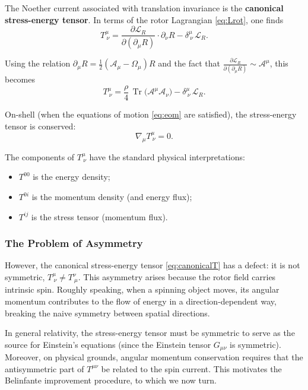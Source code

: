 \documentclass[11pt,a4paper]{article}
\numberwithin{equation}{section}
\theoremstyle{plain}
\theoremstyle{definition}
\theoremstyle{remark}
\DeclareMathOperator{\Tr}{Tr}
\begin{document}
The Noether current associated with translation invariance is the \textbf{canonical stress-energy tensor}. In terms of the rotor Lagrangian \eqref{eq:Lrot}, one finds
\begin{equation}
T^\mu_{\ \nu} = \frac{\partial \mathcal{L}_R}{\partial(\partial_\mu R)} \cdot \partial_\nu R - \delta^\mu_{\ \nu}\,\mathcal{L}_R.
\end{equation}

Using the relation $\partial_\mu R = \frac{1}{2}(\mathcal{A}_\mu - \Omega_\mu)R$ and the fact that $\frac{\partial \mathcal{L}_R}{\partial(\partial_\mu R)} \sim \mathcal{A}^\mu$, this becomes
\begin{equation}
T^\mu_{\ \nu} = \frac{\rho}{4}\,\Tr\!\big(\mathcal{A}^\mu\mathcal{A}_\nu\big) - \delta^\mu_{\ \nu}\,\mathcal{L}_R.
\label{eq:canonicalT}
\end{equation}

On-shell (when the equations of motion \eqref{eq:eom} are satisfied), the stress-energy tensor is conserved:
\begin{equation}
\nabla_\mu T^\mu_{\ \nu} = 0.
\label{eq:T-conserved}
\end{equation}

The components of $T^\mu_{\ \nu}$ have the standard physical interpretations:

\begin{itemize}
  \item $T^{00}$ is the energy density;
  \item $T^{0i}$ is the momentum density (and energy flux);
  \item $T^{ij}$ is the stress tensor (momentum flux).
\end{itemize}

\subsubsection{The Problem of Asymmetry}

However, the canonical stress-energy tensor \eqref{eq:canonicalT} has a defect: it is not symmetric, $T^\mu_{\ \nu} \neq T^\nu_{\ \mu}$. This asymmetry arises because the rotor field carries intrinsic spin. Roughly speaking, when a spinning object moves, its angular momentum contributes to the flow of energy in a direction-dependent way, breaking the naive symmetry between spatial directions.

In general relativity, the stress-energy tensor must be symmetric to serve as the source for Einstein's equations (since the Einstein tensor $G_{\mu\nu}$ is symmetric). Moreover, on physical grounds, angular momentum conservation requires that the antisymmetric part of $T^{\mu\nu}$ be related to the spin current. This motivates the Belinfante improvement procedure, to which we now turn.
\end{document}
